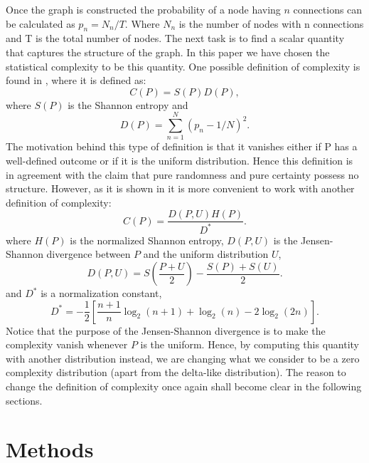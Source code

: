 \documentclass[fleqn,usenatbib]{mnras}
\begin{document}
Once the graph is constructed the probability of a node having $n$ connections can be calculated as $p_n=N_{n}/T$. Where $N_{n}$ is the number of nodes with n connections and T is the total number of nodes. The next task is to find a scalar quantity that captures the structure of the graph. In this paper we have chosen the statistical complexity to be this quantity. One possible definition of complexity is found in \cite{lopez_comp}, where it is defined as:
\begin{equation}
	C(P)=S(P)D(P),
\end{equation}
where $S(P)$ is the Shannon entropy and
\begin{equation}
	D(P)=\sum_{n=1}^{N}\left(p_n - 1/N\right)^{2}.
\end{equation}
The motivation behind this type of definition is that it vanishes either if P has a well-defined outcome or if it is the uniform distribution.  Hence this definition is in agreement with the claim that pure randomness and pure certainty possess no structure. 
However, as it is shown in \cite{sig_com} it is more convenient to work with another definition of complexity:
\begin{equation}
    C(P)=\frac{D(P,U)H(P)}{D^{*}}.
    \label{eq:comp_def}
\end{equation}
where $H(P)$ is the normalized Shannon entropy, $D(P,U)$ is the Jensen-Shannon divergence between $P$ and the uniform distribution $U$,
\begin{equation}
	D(P,U)=S\left(\frac{P+U}{2}\right) - \frac{S(P)+S(U)}{2}.
\end{equation}
and $D^{*}$ is a normalization constant,
\begin{equation}
    D^{*}=-\frac{1}{2}\left[\frac{n+1}{n}\log_2(n+1)+\log_2(n)-2\log_2(2n)\right].
\end{equation}
Notice that the purpose of the Jensen-Shannon divergence is to make the complexity vanish whenever $P$ is the uniform. Hence, by computing this quantity with another distribution instead, we are changing what we consider to be a zero complexity distribution (apart from the delta-like distribution). The reason to change the definition of complexity once again shall become clear in the following sections.
\section{Methods}
\end{document}
